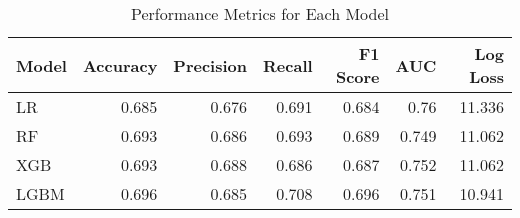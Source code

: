 \begin{table}[H]\centering
\caption{Performance Metrics for Each Model}
\label{Table 3 :performance_metrics}
\begin{tabular}{lrrrrrr}
\toprule
Model & Accuracy & Precision & Recall & F1 Score & AUC & Log Loss \\
\midrule
LR & 0.685 & 0.676 & 0.691 & 0.684 & 0.76 & 11.336 \\
RF & 0.693 & 0.686 & 0.693 & 0.689 & 0.749 & 11.062 \\
XGB & 0.693 & 0.688 & 0.686 & 0.687 & 0.752 & 11.062 \\
LGBM & 0.696 & 0.685 & 0.708 & 0.696 & 0.751 & 10.941 \\
\bottomrule
\end{tabular}
\end{table}
